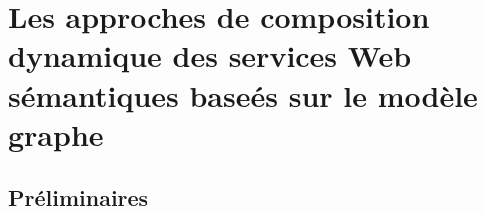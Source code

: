 \chapter{Les approches de composition dynamique des services Web sémantiques baseés sur le modèle graphe}
\newpage
\section{Préliminaires}





